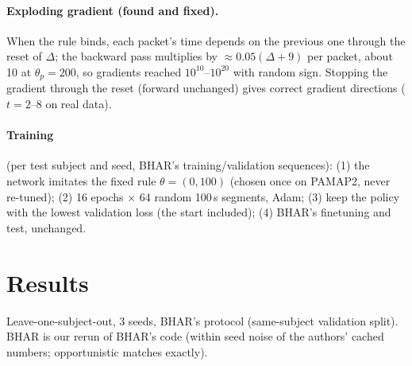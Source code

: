 \documentclass[10pt]{article}
\begin{document}
\paragraph{Exploding gradient (found and fixed).} When the rule binds, each packet's time depends on the previous one through the reset of $\Delta$; the backward pass multiplies by $\approx 0.05(\Delta + 9)$ per packet, about 10 at $\theta_p=200$, so gradients reached $10^{10}$--$10^{20}$ with random sign. Stopping the gradient through the reset (forward unchanged) gives correct gradient directions ($t = 2$--$8$ on real data).

\paragraph{Training} (per test subject and seed, BHAR's training/validation sequences):
(1) the network imitates the fixed rule $\theta = (0,100)$ (chosen once on PAMAP2, never re-tuned);
(2) 16 epochs $\times$ 64 random 100\,s segments, Adam;
(3) keep the policy with the lowest validation loss (the start included);
(4) BHAR's finetuning and test, unchanged.

\section{Results}
Leave-one-subject-out, 3 seeds, BHAR's protocol (same-subject validation split). BHAR is our rerun of BHAR's code (within seed noise of the authors' cached numbers; opportunistic matches exactly).

\begin{table}[H]
\centering
\caption{Test accuracy / F1 / packets per second per sensor. Fixed (0,100) is our starting rule without training.}
\label{tab:main}
\end{table}
\end{document}
